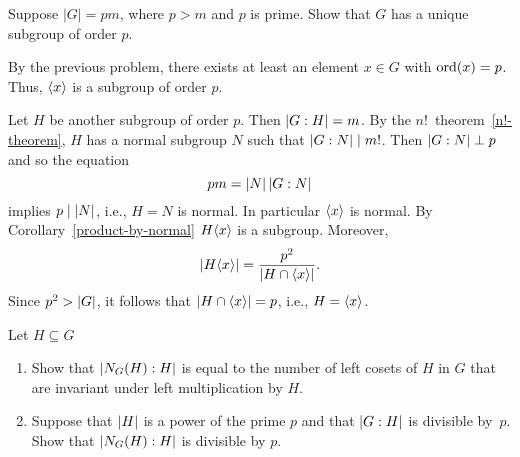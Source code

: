 \begin{solution}
\begin{enumerate}[\rm a)]
\end{enumerate}
\end{solution}

\begin{probl}\label{problem-1.A.9}
    Suppose $|G| = pm$, where $p > m$ and $p$ is prime. Show that $G$ has a unique subgroup of order $p$.
\end{probl}

\begin{solution} By the previous problem, there exists at least an element $x\in G$ with ${\rm ord}(x)=p$. Thus, $\langle x\rangle$ is a subgroup of order $p$.

Let $H$ be another subgroup of order $p$. Then $\left\vert{G:H}\right\vert=m$. By the $n!$~theorem~\ref{n!-theorem}, $H$ has a normal subgroup $N$ such that $\left\vert{G:N}\right\vert\mid m!$. Then $\left\vert{G:N}\right\vert\perp p$ and so the equation
$$
    pm=\left\vert{N}\right\vert\left\vert{G:N}\right\vert
$$
implies $p\mid\left\vert{N}\right\vert$, i.e., $H=N$ is normal. In particular $\langle x\rangle$ is normal. By Corollary~\ref{product-by-normal} $H\langle x\rangle$ is a subgroup. Moreover,
$$
    \left\vert{H\langle x\rangle}\right\vert = \frac{p^2}{\left\vert{H\cap\langle x\rangle}\right\vert}.
$$
Since $p^2>\left\vert{G}\right\vert$, it follows that $\left\vert{H\cap\langle x\rangle}\right\vert=p$, i.e., $H=\langle x\rangle$.  \end{solution}

\begin{probl}\label{problem-1.A.10}
    Let $H\subseteq G$
    \begin{enumerate}[\rm a)]
        \item Show that $\left\vert{N_G(H):H}\right\vert$ is equal to the number of left cosets of\/ $H$ in $G$ that are invariant under left multiplication by $H$.

        \item Suppose that $\left\vert{H}\right\vert$ is a power of the prime $p$ and that $\left\vert{G:H}\right\vert$ is divisible by~$p$. Show that $\left\vert{N_G(H):H}\right\vert$ is divisible by\/ $p$.
    \end{enumerate}
\end{probl}

